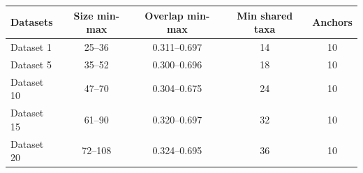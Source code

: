 \begin{tabular}{lcccc}
\hline
Datasets & Size min-max & Overlap min-max & Min shared taxa & Anchors \\
\hline
Dataset 1 & 25--36 & 0.311--0.697 & 14 & 10 \\
Dataset 5 & 35--52 & 0.300--0.696 & 18 & 10 \\
Dataset 10 & 47--70 & 0.304--0.675 & 24 & 10 \\
Dataset 15 & 61--90 & 0.320--0.697 & 32 & 10 \\
Dataset 20 & 72--108 & 0.324--0.695 & 36 & 10 \\
\hline
\end{tabular}

